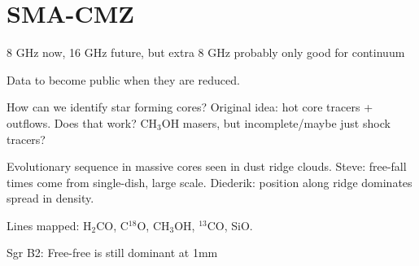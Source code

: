 \section{SMA-CMZ}
8 GHz now, 16 GHz future, but extra 8 GHz probably only good for continuum

Data to become public when they are reduced.

How can we identify star forming cores?  Original idea: hot core tracers + outflows.  Does that work? CH$_3$OH masers, but incomplete/maybe just shock tracers?

Evolutionary sequence in massive cores seen in dust ridge clouds.  Steve: free-fall times come from single-dish, large scale.  Diederik: position along ridge dominates spread in density.

Lines mapped: H$_2$CO, C$^{18}$O, CH$_3$OH, $^{13}$CO, SiO.

Sgr B2: Free-free is still dominant at 1mm